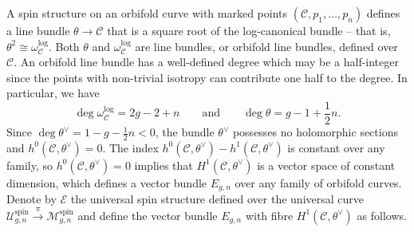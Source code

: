 \documentclass[a4paper]{article}
\theoremstyle{plain}
\theoremstyle{definition}
\newcommand{\modm}{\mathcal{M}}
\newcommand{\bq}{\mathbb{Q}}
\newcommand{\cc}{\mathcal{C}}
\newcommand{\ce}{\mathcal{E}}
\newcommand{\co}{\mathcal{O}}
\newcommand{\cu}{\mathcal{U}}
\begin{document}








A spin structure on an orbifold curve with marked points $(\cc,p_1,\dots,p_n)$ defines a line bundle $\theta\to\cc$ that is a square root of the log-canonical bundle -- that is, $\theta^2\cong\omega_\cc^{\text{log}}$. Both $\theta$ and $\omega_\cc^{\text{log}}$ are line bundles, or orbifold line bundles, defined over $\cc$. An orbifold line bundle has a well-defined degree which may be a half-integer since the points with non-trivial isotropy can contribute one half to the degree. In particular, we have
\[
\deg\omega_{\cc}^{\text{log}}=2g-2+n \qquad \text{and} \qquad \deg\theta=g-1+\frac{1}{2}n.
\] 
Since $\deg\theta^{\vee}=1-g-\frac{1}{2}n < 0$, the bundle $\theta^{\vee}$ possesses no holomorphic sections and $h^0(\cc,\theta^{\vee})=0$. The index $h^0(\cc,\theta^{\vee})-h^1(\cc,\theta^{\vee})$ is constant over any family, so $h^0(\cc,\theta^{\vee})=0$ implies that $H^1(\cc,\theta^{\vee})$ is a vector space of constant dimension, which defines a vector bundle $E_{g,n}$ over any family of orbifold curves. Denote by $\ce$ the universal spin structure defined over the universal curve $\cu_{g,n}^{\text{spin}}\stackrel{\pi}{\longrightarrow}\modm_{g,n}^{\text{spin}}$ and define the vector bundle $E_{g,n}$ with fibre $H^1(\cc,\theta^{\vee})$ as follows.
\end{document}
